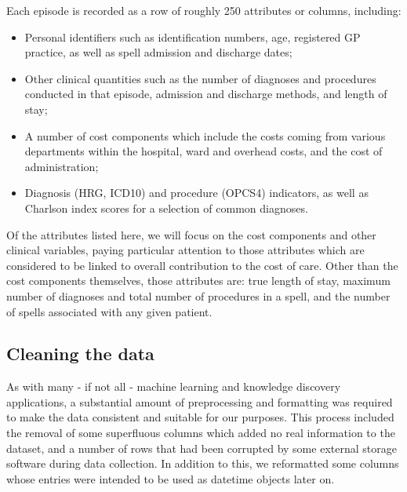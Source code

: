 \noindent
Each episode is recorded as a row of roughly 250 attributes or columns,
including:
\begin{itemize}
    \item Personal identifiers such as identification numbers, age, registered
        GP practice, as well as spell admission and discharge dates;
    \item Other clinical quantities such as the number of diagnoses and
        procedures conducted in that episode, admission and discharge methods,
        and length of stay;
    \item A number of cost components which include the costs coming from
        various departments within the hospital, ward and overhead costs, and
        the cost of administration;
    \item Diagnosis (HRG, ICD10) and procedure (OPCS4) indicators, as well as
        Charlson index scores for a selection of common diagnoses.\\
\end{itemize}

Of the attributes listed here, we will focus on the cost components and other
clinical variables, paying particular attention to those attributes which are
considered to be linked to overall contribution to the cost of care. Other than
the cost components themselves, those attributes are: true length of stay,
maximum number of diagnoses and total number of procedures in a spell, and the
number of spells associated with any given patient.


\subsection{Cleaning the data}\label{subsec:formatting}

As with many \-- if not all \-- machine learning and knowledge discovery
applications, a substantial amount of preprocessing and formatting was required
to make the data consistent and suitable for our purposes. This process included
the removal of some superfluous columns which added no real information to the
dataset, and a number of rows that had been corrupted by some external storage
software during data collection. In addition to this, we reformatted some
columns whose entries were intended to be used as datetime objects later on.
